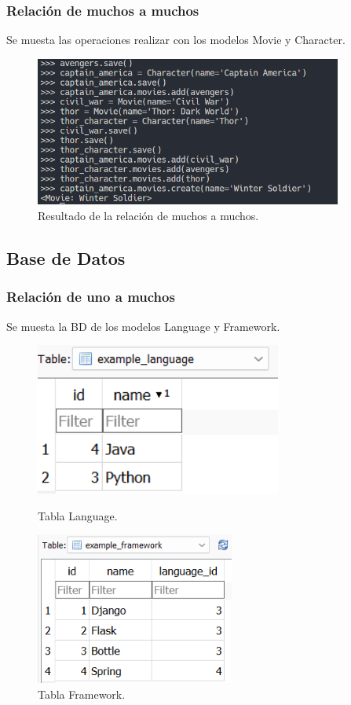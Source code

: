 \documentclass{article}
\begin{document}
\subsubsection{Relación de muchos a muchos}
Se muesta las operaciones realizar con los modelos Movie y Character.
\begin{figure}[H]
	\centering
	\includegraphics[width=0.9\textwidth,keepaspectratio]{img/r2operations.png}
	\caption{Resultado de la relación de muchos a muchos.}
\end{figure}

\subsection{Base de Datos}

\subsubsection{Relación de uno a muchos}
Se muesta la BD de los modelos Language y Framework.
\begin{figure}[H]
	\centering
	\begin{minipage}{0.4\textwidth}
		\includegraphics[width=\linewidth, height=5cm, keepaspectratio]{img/r1tabla1.png}
		\caption{Tabla Language.}
	\end{minipage}
	\hspace{0.5cm} %
	\begin{minipage}{0.4\textwidth}
		\centering
		\includegraphics[width=\linewidth, height=5cm, keepaspectratio]{img/r1tabla2.png}
		\caption{Tabla Framework.}
	\end{minipage}
\end{figure}
\end{document}
